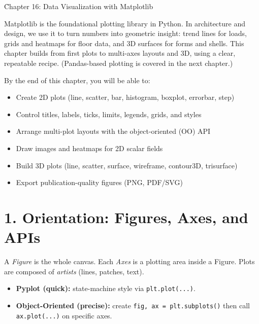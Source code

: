 
\h*{Chapter 16: Data Visualization with Matplotlib}

Matplotlib is the foundational plotting library in Python. In architecture and design, we use it to turn numbers into geometric insight: trend lines for loads, grids and heatmaps for floor data, and 3D surfaces for forms and shells. This chapter builds from first plots to multi-axes layouts and 3D, using a clear, repeatable recipe. (Pandas-based plotting is covered in the next chapter.)

By the end of this chapter, you will be able to:
\begin{itemize}
    \item Create 2D plots (line, scatter, bar, histogram, boxplot, errorbar, step)
    \item Control titles, labels, ticks, limits, legends, grids, and styles
    \item Arrange multi-plot layouts with the object-oriented (OO) API
    \item Draw images and heatmaps for 2D scalar fields
    \item Build 3D plots (line, scatter, surface, wireframe, contour3D, trisurface)
    \item Export publication-quality figures (PNG, PDF/SVG)
\end{itemize}

\section{1. Orientation: Figures, Axes, and APIs}
A \emph{Figure} is the whole canvas. Each \emph{Axes} is a plotting area inside a Figure. Plots are composed of \emph{artists} (lines, patches, text).

\begin{itemize}
    \item \textbf{Pyplot (quick):} state-machine style via \texttt{plt.plot(...)}.
    \item \textbf{Object-Oriented (precise):} create \texttt{fig, ax = plt.subplots()} then call \texttt{ax.plot(...)} on specific axes.
\end{itemize}

